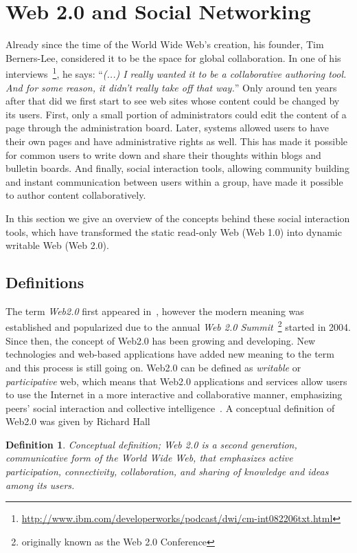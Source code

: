 \documentclass[ngerman,UKenglish,table]{scrbook}
\newtheorem{definition}{Definition}
\begin{document}
\section{Web 2.0 and Social Networking}

Already since the time of the World Wide Web's creation, his founder, Tim Berners-Lee, considered it to be the space for global collaboration.
In one of his interviews~\footnote{\url{http://www.ibm.com/developerworks/podcast/dwi/cm-int082206txt.html}}, he says: ``\emph{(...) I really wanted it to be a collaborative authoring tool. And for some reason, it didn't really take off that way.}''
Only around ten years after that did we first start to see web sites whose content could be changed by its users.
First, only a small portion of administrators could edit the content of a page through the administration board.
Later, systems allowed users to have their own pages and have administrative rights as well.
This has made it possible for common users to write down and share their thoughts within blogs and bulletin boards.
And finally, social interaction tools, allowing community building and instant communication between users within a group, have made it possible to author content collaboratively.

In this section we give an overview of the concepts behind these social interaction tools, which have transformed the static read-only Web (Web 1.0) into dynamic writable Web (Web 2.0).

\subsection{Definitions}

The term \emph{Web2.0} first appeared in~\cite{dinucci1999fragmented}, however the modern meaning was established and popularized due to the annual \emph{Web 2.0 Summit}~\footnote{originally known as the Web 2.0 Conference} started in 2004.
Since then, the concept of Web2.0 has been growing and developing.
New technologies and web-based applications have added new meaning to the term and this process is still going on.
Web2.0 can be defined as \emph{writable} or \emph{participative} web, which means that Web2.0 applications and services allow users to use the Internet in a more interactive and collaborative manner, emphasizing peers’ social interaction and collective intelligence~\cite{murugesan2007understanding}.
A conceptual definition of Web2.0 was given by Richard Hall\cite{hall2009towards}
\begin{definition}{Conceptual definition}; Web 2.0 is a second generation, communicative form of the World Wide Web, that emphasizes active participation, connectivity, collaboration, and sharing of knowledge and ideas among its users.
\end{definition}
\end{document}
